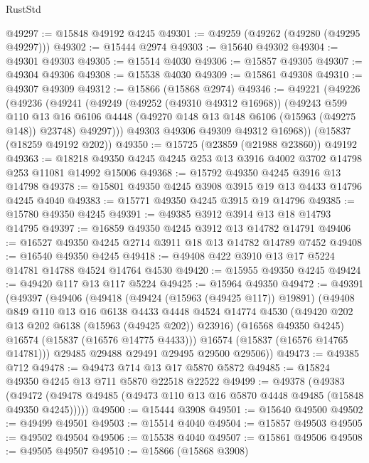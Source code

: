 \begin{lexlean}{RustStd}
\begin{coremodule}
@49297 := @15848 @49192 @4245
@49301 := @49259 (@49262 (@49280 (@49295 @49297)))
@49302 := @15444 @2974
@49303 := @15640 @49302
@49304 := @49301 @49303
@49305 := @15514 @4030
@49306 := @15857 @49305
@49307 := @49304 @49306
@49308 := @15538 @4030
@49309 := @15861 @49308
@49310 := @49307 @49309
@49312 := @15866 (@15868 @2974)
@49346 := @49221
    (@49226
      (@49236
        (@49241
          (@49249
            (@49252 (@49310 @49312 @16968))
            (@49243
              @599
              @110
              @13
              @16
              @6106
              @4448
              (@49270 @148 @13 @148 @6106 (@15963 (@49275 @148)) @23748)
              @49297)))
        @49303
        @49306
        @49309
        @49312
        @16968))
    (@15837 (@18259 @49192 @202))
@49350 := @15725 (@23859 (@21988 @23860)) @49192
@49363 := @18218 @49350 @4245 @4245 @253 @13 @3916 @4002 @3702 @14798 @253 @11081 @14992 @15006
@49368 := @15792 @49350 @4245 @3916 @13 @14798
@49378 := @15801 @49350 @4245 @3908 @3915 @19 @13 @4433 @14796 @4245 @4040
@49383 := @15771 @49350 @4245 @3915 @19 @14796
@49385 := @15780 @49350 @4245
@49391 := @49385 @3912 @3914 @13 @18 @14793 @14795
@49397 := @16859 @49350 @4245 @3912 @13 @14782 @14791
@49406 := @16527 @49350 @4245 @2714 @3911 @18 @13 @14782 @14789 @7452
@49408 := @16540 @49350 @4245
@49418 := @49408 @422 @3910 @13 @17 @5224 @14781 @14788 @4524 @14764 @4530
@49420 := @15955 @49350 @4245
@49424 := @49420 @117 @13 @117 @5224
@49425 := @15964 @49350
@49472 := @49391
    (@49397
      (@49406
        (@49418
          (@49424 (@15963 (@49425 @117)) @19891)
          (@49408
            @849
            @110
            @13
            @16
            @6138
            @4433
            @4448
            @4524
            @14774
            @4530
            (@49420 @202 @13 @202 @6138 (@15963 (@49425 @202)) @23916)
            (@16568 @49350 @4245)
            @16574
            (@15837 (@16576 @14775 @4433)))
          @16574
          (@15837 (@16576 @14765 @14781)))
        @29485
        @29488
        @29491
        @29495
        @29500
        @29506))
@49473 := @49385 @712
@49478 := @49473 @714 @13 @17 @5870 @5872
@49485 := @15824 @49350 @4245 @13 @711 @5870 @22518 @22522
@49499 := @49378
    (@49383 (@49472 (@49478 @49485 (@49473 @110 @13 @16 @5870 @4448 @49485 (@15848 @49350 @4245)))))
@49500 := @15444 @3908
@49501 := @15640 @49500
@49502 := @49499 @49501
@49503 := @15514 @4040
@49504 := @15857 @49503
@49505 := @49502 @49504
@49506 := @15538 @4040
@49507 := @15861 @49506
@49508 := @49505 @49507
@49510 := @15866 (@15868 @3908)

\end{coremodule}
\end{lexlean}

